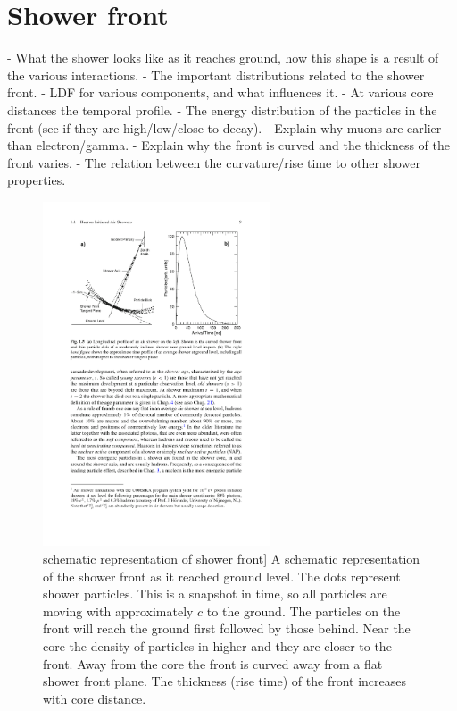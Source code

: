 \section{Shower front}

- What the shower looks like as it reaches ground, how this shape is a result of the various interactions.
- The important distributions related to the shower front.
- LDF for various components, and what influences it.
- At various core distances the temporal profile.
- The energy distribution of the particles in the front (see if they are high/low/close to decay).
- Explain why muons are earlier than electron/gamma.
- Explain why the front is curved and the thickness of the front varies.
- The relation between the curvature/rise time to other shower properties.

\begin{figure}
    \centering
    \includegraphics[width=0.6\textwidth]
                    {plots/cosmic-rays/schematic_front}
    \caption{schematic representation of shower front]
A schematic representation of the shower front as it reached ground level. The dots represent shower particles. This is a snapshot in time, so all particles are moving with approximately $c$ to the ground. The particles on the front will reach the ground first followed by those behind. Near the core the density of particles in higher and they are closer to the front. Away from the core the front is curved away from a flat shower front plane. The thickness (rise time) of the front increases with core distance.}
    \label{fig:schematic_front}
\end{figure}


